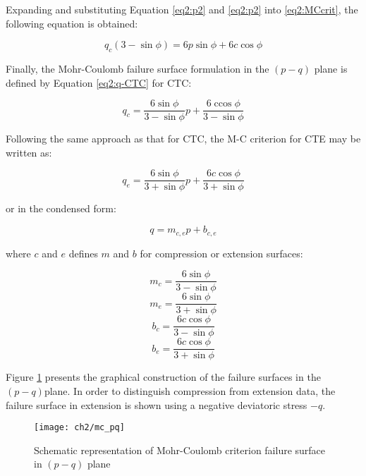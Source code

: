 Expanding and substituting Equation \ref{eq2:p2} and \ref{eq2:p2} into \ref{eq2:MCcrit}, the following equation is obtained:

\begin{equation}
    q_c(3-\sin \phi) = 6p \sin \phi + 6 c\cos \phi
\end{equation}

Finally, the Mohr-Coulomb failure surface formulation in the $(p-q)$ plane is defined by Equation \ref{eq2:q-CTC} for CTC:

\begin{equation}\label{eq2:q-CTC}
    q_c=\frac{6 \sin \phi}{3-\sin \phi} p+\frac{6 \operatorname{ccos} \phi}{3-\sin \phi} 
\end{equation}

Following the same approach as that for CTC, the M-C criterion for CTE may be written as:

\begin{equation}\label{eq2:q-CTE}
    q_e=\frac{6 \sin \phi}{3+\sin \phi} p+\frac{6 c \cos \phi}{3+\sin \phi}
\end{equation}

or in the condensed form: 

\begin{equation}\label{MC_q}
    q = m_{c,e} p + b_{c,e}
\end{equation}

where $c$ and $e$  defines $m$ and $b$ for compression or extension surfaces:

\begin{equation}\label{eq2:MC_mc_q}
    m_c=\frac{6 \sin \phi}{3-\sin \phi} 
\end{equation}
\begin{equation}\label{eq2:MC_me_q}
    m_e=\frac{6 \sin \phi}{3+\sin \phi} 
\end{equation}
\begin{equation}\label{eq2:MC_bc_q}
    b_c=\frac{6 c \cos \phi}{3-\sin \phi}
\end{equation}
\begin{equation}\label{eq2:MC_be_q}
    b_e=\frac{6 c \cos \phi}{3+\sin \phi}
\end{equation}

Figure \ref{fig2:mc_pq} presents the graphical construction of the failure surfaces in the  $(p-q)$plane. In order to distinguish compression from extension data, the failure surface in extension is shown using a negative deviatoric stress $-q$. 

\begin{figure}[tb]
    \centering
    \texttt{[image: ch2/mc\_pq]}
    \caption{Schematic representation of Mohr-Coulomb criterion failure surface in $(p-q)$ plane}
    \label{fig2:mc_pq}
\end{figure} 

